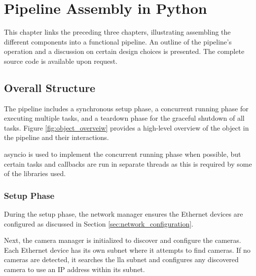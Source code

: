 
\chapter{Pipeline Assembly in Python}
\label{chap:pipeline}
This chapter links the preceding three chapters, illustrating assembling the different components into a functional pipeline.
An outline of the pipeline's operation and a discussion on certain design choices is presented.
The complete source code is available upon request.



\section{Overall Structure}
The pipeline includes a synchronous setup phase, a concurrent running phase for executing multiple tasks, and a teardown phase for the graceful shutdown of all tasks.
Figure \ref{fig:object_overveiw} provides a high-level overview of the object in the pipeline and their interactions.

\gls{asyncio} is used to implement the concurrent running phase when possible, but certain tasks and callbacks are run in separate threads as this is required by some of the libraries used.


\subsection{Setup Phase}
\label{sec:discovery}

During the setup phase, the network manager ensures the Ethernet devices are configured as discussed in Section \ref{sec:network_configuration}.

Next, the camera manager is initialized to discover and configure the cameras.
Each Ethernet device has its own subnet where it attempts to find cameras.
If no cameras are detected, it searches the \gls{lla} subnet and configures any discovered camera to use an IP address within its subnet.


